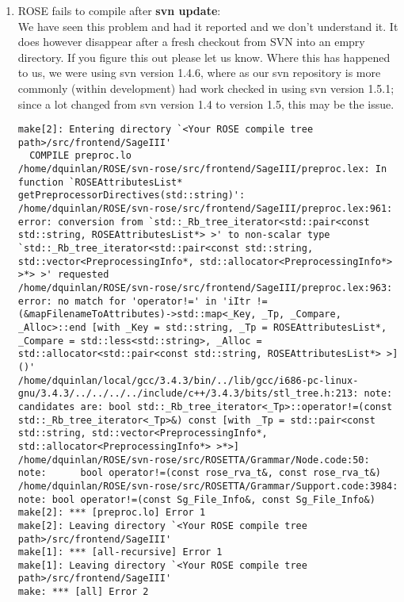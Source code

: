 \begin{enumerate}
   \item ROSE fails to compile after {\bf svn update}: \\
   We have seen this problem and had it reported and we don't understand it.
It does however disappear after a fresh checkout from SVN into an empry directory.
If you figure this out please let us know.  Where this has happened to us, we
were using svn version  1.4.6, where as our svn repository is more commonly
(within development) had work checked in using svn version 1.5.1; since a lot
changed from svn version 1.4 to version 1.5, this may be the issue.
{\scriptsize
\begin{verbatim}
make[2]: Entering directory `<Your ROSE compile tree path>/src/frontend/SageIII'
  COMPILE preproc.lo
/home/dquinlan/ROSE/svn-rose/src/frontend/SageIII/preproc.lex: In function `ROSEAttributesList* getPreprocessorDirectives(std::string)':
/home/dquinlan/ROSE/svn-rose/src/frontend/SageIII/preproc.lex:961: error: conversion from `std::_Rb_tree_iterator<std::pair<const std::string, ROSEAttributesList*> >' to non-scalar type `std::_Rb_tree_iterator<std::pair<const std::string, std::vector<PreprocessingInfo*, std::allocator<PreprocessingInfo*> >*> >' requested
/home/dquinlan/ROSE/svn-rose/src/frontend/SageIII/preproc.lex:963: error: no match for 'operator!=' in 'iItr != (&mapFilenameToAttributes)->std::map<_Key, _Tp, _Compare, _Alloc>::end [with _Key = std::string, _Tp = ROSEAttributesList*, _Compare = std::less<std::string>, _Alloc = std::allocator<std::pair<const std::string, ROSEAttributesList*> >]()'
/home/dquinlan/local/gcc/3.4.3/bin/../lib/gcc/i686-pc-linux-gnu/3.4.3/../../../../include/c++/3.4.3/bits/stl_tree.h:213: note: candidates are: bool std::_Rb_tree_iterator<_Tp>::operator!=(const std::_Rb_tree_iterator<_Tp>&) const [with _Tp = std::pair<const std::string, std::vector<PreprocessingInfo*, std::allocator<PreprocessingInfo*> >*>]
/home/dquinlan/ROSE/svn-rose/src/ROSETTA/Grammar/Node.code:50: note:      bool operator!=(const rose_rva_t&, const rose_rva_t&)
/home/dquinlan/ROSE/svn-rose/src/ROSETTA/Grammar/Support.code:3984: note: bool operator!=(const Sg_File_Info&, const Sg_File_Info&)
make[2]: *** [preproc.lo] Error 1
make[2]: Leaving directory `<Your ROSE compile tree path>/src/frontend/SageIII'
make[1]: *** [all-recursive] Error 1
make[1]: Leaving directory `<Your ROSE compile tree path>/src/frontend/SageIII'
make: *** [all] Error 2
\end{verbatim}
}

\end{enumerate}



